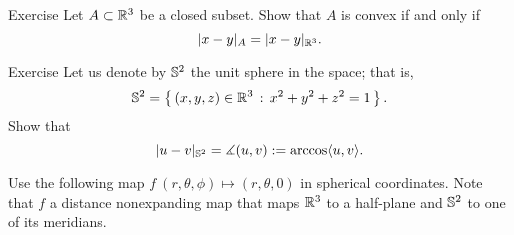 \begin{thm}{Exercise}\label{ex:intrinsic-convex}
Let $A\subset \mathbb{R}^3$ be a closed subset.
Show that $A$ is convex if and only if
\[|x-y|_A=|x-y|_{\mathbb{R}^3}.\]
\end{thm}

\begin{thm}{Exercise}
Let us denote by $\mathbb{S}^2$ the unit sphere in the space; that is,
\[\mathbb{S}^2=\left\{\,{(x,y,z)\in\mathbb{R}^3}\,:\,{x^2+y^2+z^2=1}\,\right\}.\]
Show that
\[|u-v|_{\mathbb{S}^2}=\measuredangle(u,v):=\arccos\langle u,v\rangle.\]

\end{thm}

 Use the following map $f\:(r,\theta,\phi)\mapsto (r,\theta,0)$ in spherical coordinates. Note that $f$ a distance nonexpanding map that maps $\mathbb{R}^3$ to a half-plane and $\mathbb{S}^2$ to one of its meridians.




